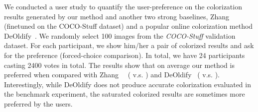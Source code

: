 \begin{table}[!t]
    \centering
    \caption{\textbf{Quantitative comparison at the instance level.} The methods in the first block are trained using the ImageNet dataset. The symbol  denotes the methods that are finetuned on the COCO-Stuff training set.}
    \label{tab:instance_comp}
\end{table} 


We conducted a user study to quantify the user-preference on the colorization results generated by our method and another two strong baselines, Zhang~\etal~\cite{Zhang-SIGGRAPHASIA-2018} (finetuned on the COCO-Stuff dataset) and a popular online colorization method DeOldify~\cite{Deoldify}.
We randomly select 100 images from the \emph{COCO-Stuff} validation dataset.
For each participant, we show him/her a pair of colorized results and ask for the preference (forced-choice comparison).
In total, we have 24 participants casting 2400 votes in total.
The results show that on average our method is preferred when compared with Zhang~\etal~\cite{Zhang-SIGGRAPHASIA-2018} ( v.s. ) and DeOldify~\cite{Deoldify} ( v.s. ). 
Interestingly, while DeOldify does not produce accurate colorization evaluated in the benchmark experiment, the saturated colorized results are sometimes more preferred by the users.


